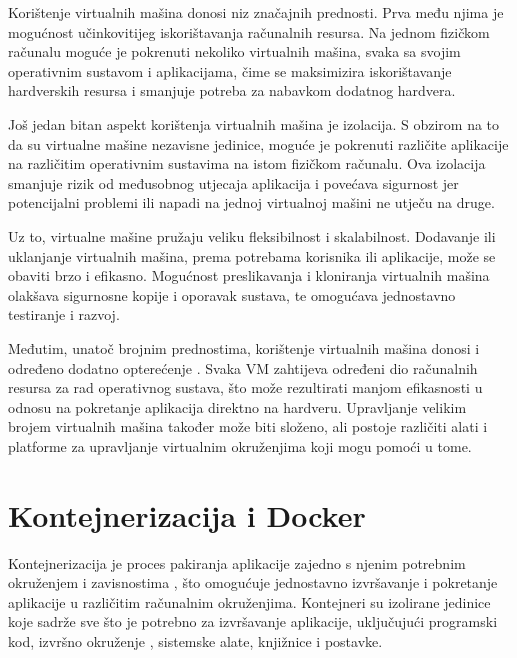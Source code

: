\documentclass[times, utf8, diplomski]{fer}
\begin{document}
Korištenje virtualnih mašina donosi niz značajnih prednosti. Prva među njima je mogućnost učinkovitijeg iskorištavanja računalnih resursa. Na jednom fizičkom računalu moguće je pokrenuti nekoliko virtualnih mašina, svaka sa svojim operativnim sustavom i aplikacijama, čime se maksimizira iskorištavanje hardverskih resursa i smanjuje potreba za nabavkom dodatnog hardvera.

Još jedan bitan aspekt korištenja virtualnih mašina je izolacija. S obzirom na to da su virtualne mašine nezavisne jedinice, moguće je pokrenuti različite aplikacije na različitim operativnim sustavima na istom fizičkom računalu. Ova izolacija smanjuje rizik od međusobnog utjecaja aplikacija i povećava sigurnost jer potencijalni problemi ili napadi na jednoj virtualnoj mašini ne utječu na druge.

Uz to, virtualne mašine pružaju veliku fleksibilnost i skalabilnost. Dodavanje ili uklanjanje virtualnih mašina, prema potrebama korisnika ili aplikacije, može se obaviti brzo i efikasno. Mogućnost preslikavanja  i kloniranja virtualnih mašina olakšava sigurnosne kopije  i oporavak sustava, te omogućava jednostavno testiranje i razvoj.

Međutim, unatoč brojnim prednostima, korištenje virtualnih mašina donosi i određeno dodatno opterećenje . Svaka VM zahtijeva određeni dio računalnih resursa za rad operativnog sustava, što može rezultirati manjom efikasnosti u odnosu na pokretanje aplikacija direktno na hardveru. Upravljanje velikim brojem virtualnih mašina također može biti složeno, ali postoje različiti alati i platforme za upravljanje virtualnim okruženjima koji mogu pomoći u tome.

\section{Kontejnerizacija i Docker}

Kontejnerizacija je proces pakiranja aplikacije zajedno s njenim potrebnim okruženjem i zavisnostima , što omogućuje jednostavno izvršavanje i pokretanje aplikacije u različitim računalnim okruženjima. Kontejneri su izolirane jedinice koje sadrže sve što je potrebno za izvršavanje aplikacije, uključujući programski kod, izvršno okruženje , sistemske alate, knjižnice i postavke. \\
\end{document}
